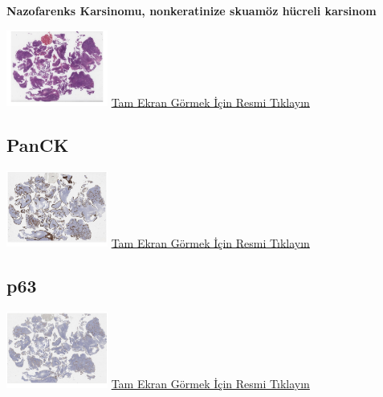 \documentclass[
  letterpaper,
  DIV=11,
  numbers=noendperiod]{scrreprt}
\begin{document}
\textbf{Nazofarenks Karsinomu, nonkeratinize skuamöz hücreli karsinom}

\href{https://images.patolojiatlasi.com/nasopharynx-nonkeratinizing-scc/HE.html}{\includegraphics[width=0.25\textwidth,height=\textheight]{./screenshots/thumbnail_nasopharynx-nonkeratinizing-scc-HE.png}}
\href{https://images.patolojiatlasi.com/nasopharynx-nonkeratinizing-scc/HE.html}{Tam
Ekran Görmek İçin Resmi Tıklayın}

\hypertarget{panck}{%
\subsection{PanCK}\label{panck}}

\href{https://images.patolojiatlasi.com/nasopharynx-nonkeratinizing-scc/panCK.html}{\includegraphics[width=0.25\textwidth,height=\textheight]{./screenshots/thumbnail_nasopharynx-nonkeratinizing-scc-panCK.png}}
\href{https://images.patolojiatlasi.com/nasopharynx-nonkeratinizing-scc/panCK.html}{Tam
Ekran Görmek İçin Resmi Tıklayın}

\hypertarget{p63}{%
\subsection{p63}\label{p63}}

\href{https://images.patolojiatlasi.com/nasopharynx-nonkeratinizing-scc/p63.html}{\includegraphics[width=0.25\textwidth,height=\textheight]{./screenshots/thumbnail_nasopharynx-nonkeratinizing-scc-p63.png}}
\href{https://images.patolojiatlasi.com/nasopharynx-nonkeratinizing-scc/p63.html}{Tam
Ekran Görmek İçin Resmi Tıklayın}
\end{document}
